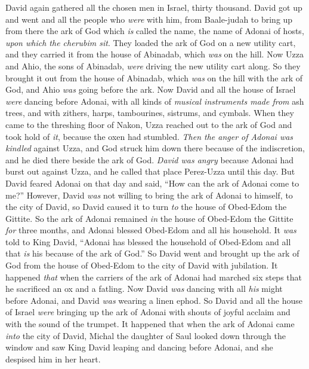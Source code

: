 \begin{biblechapter} %
 David again gathered all the chosen men in Israel, thirty thousand.
\verse David got up and went and all the people who \textit{were} with him, from Baale-judah to bring up from there the ark of God which \textit{is} called the name, the name of Adonai of hosts, \textit{upon which the cherubim sit}.
\verse They loaded the ark of God on a new utility cart, and they carried it from the house of Abinadab, which \textit{was} on the hill. Now Uzza and Ahio, the sons of Abinadab, \textit{were} driving the new utility cart along.
\verse So they brought it out from the house of Abinadab, which \textit{was} on the hill with the ark of God, and Ahio \textit{was} going before the ark.
\verse Now David and all the house of Israel \textit{were} dancing before Adonai, with all kinds of \textit{musical instruments made from} ash trees, and with zithers, harps, tambourines, sistrums, and cymbals.
\verse When they came to the threshing floor of Nakon, Uzza reached out to the ark of God and took hold of \textit{it}, because the oxen had stumbled.
\verse \textit{Then the anger of Adonai was kindled} against Uzza, and God struck him down there because of the indiscretion, and he died there beside the ark of God.
\verse \textit{David was angry} because Adonai had burst out against Uzza, and he called that place Perez-Uzza until this day.
\verse But David feared Adonai on that day and said, “How can the ark of Adonai come to me?”
\verse However, David \textit{was} not willing to bring the ark of Adonai to himself, to the city of David, so David caused it to turn \textit{to} the house of Obed-Edom the Gittite.
\verse So the ark of Adonai remained \textit{in} the house of Obed-Edom the Gittite \textit{for} three months, and Adonai blessed Obed-Edom and all his household.
\verse It \textit{was} told to King David, “Adonai has blessed the household of Obed-Edom and all that \textit{is} his because of the ark of God.” So David went and brought up the ark of God from the house of Obed-Edom to the city of David with jubilation.
\verse It happened \textit{that} when the carriers of the ark of Adonai had marched six steps that he sacrificed an ox and a fatling.
\verse Now David \textit{was} dancing with all \textit{his} might before Adonai, and David \textit{was} wearing a linen ephod.
\verse So David and all the house of Israel \textit{were} bringing up the ark of Adonai with shouts of joyful acclaim and with the sound of the trumpet.
\verse It happened that when the ark of Adonai came \textit{into} the city of David, Michal the daughter of Saul looked down through the window and saw King David leaping and dancing before Adonai, and she despised him in her heart.

\end{biblechapter}
